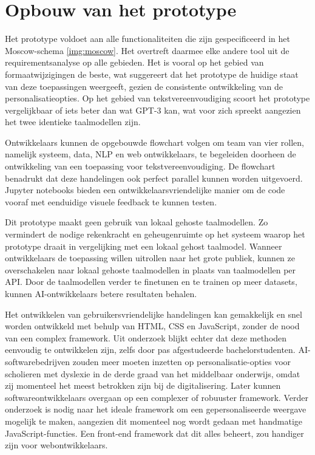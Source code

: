 \section{Opbouw van het prototype}

Het prototype voldoet aan alle functionaliteiten die zijn gespecificeerd in het Moscow-schema \ref{img:moscow}. Het overtreft daarmee elke andere tool uit de requirementsanalyse op alle gebieden. Het is vooral op het gebied van formaatwijzigingen de beste, wat suggereert dat het prototype de huidige staat van deze toepassingen weergeeft, gezien de consistente ontwikkeling van de personalisatieopties. Op het gebied van tekstvereenvoudiging scoort het prototype vergelijkbaar of iets beter dan wat GPT-3 kan, wat voor zich spreekt aangezien het twee identieke taalmodellen zijn.

\medspace

Ontwikkelaars kunnen de opgebouwde flowchart volgen om team van vier rollen, namelijk systeem, data, NLP en web ontwikkelaars, te begeleiden doorheen de ontwikkeling van een toepassing voor tekstvereenvoudiging. De flowchart benadrukt dat deze handelingen ook perfect parallel kunnen worden uitgevoerd. Jupyter notebooks bieden een ontwikkelaarsvriendelijke manier om de code vooraf met eenduidige visuele feedback te kunnen testen.

\medspace

Dit prototype maakt geen gebruik van lokaal gehoste taalmodellen. Zo vermindert de nodige rekenkracht en geheugenruimte op het systeem waarop het prototype draait in vergelijking met een lokaal gehost taalmodel. Wanneer ontwikkelaars de toepassing willen uitrollen naar het grote publiek, kunnen ze overschakelen naar lokaal gehoste taalmodellen in plaats van taalmodellen per API. Door de taalmodellen verder te finetunen en te trainen op meer datasets, kunnen AI-ontwikkelaars betere resultaten behalen. 

\medspace

Het ontwikkelen van gebruikersvriendelijke handelingen kan gemakkelijk en snel worden ontwikkeld met behulp van HTML, CSS en JavaScript, zonder de nood van een complex framework. Uit onderzoek blijkt echter dat deze methoden eenvoudig te ontwikkelen zijn, zelfs door pas afgestudeerde bachelorstudenten. AI-softwarebedrijven zouden meer moeten inzetten op personalisatie-opties voor scholieren met dyslexie in de derde graad van het middelbaar onderwijs, omdat zij momenteel het meest betrokken zijn bij de digitalisering. Later kunnen softwareontwikkelaars overgaan op een complexer of robuuster framework. Verder onderzoek is nodig naar het ideale framework om een gepersonaliseerde weergave mogelijk te maken, aangezien dit momenteel nog wordt gedaan met handmatige JavaScript-functies. Een front-end framework dat dit alles beheert, zou handiger zijn voor webontwikkelaars.

